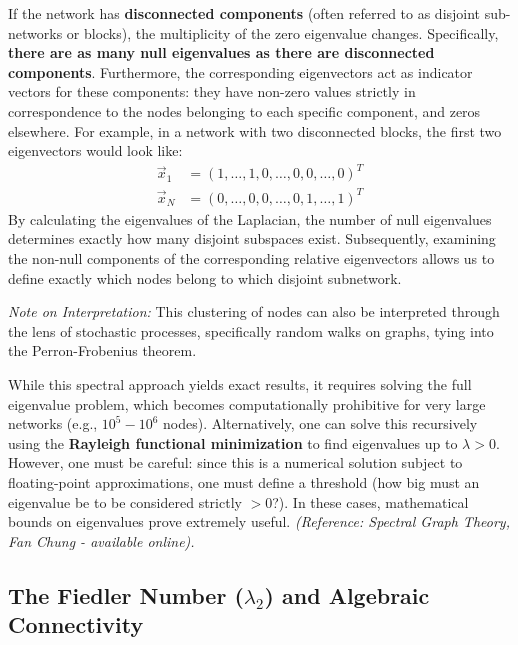 If the network has \textbf{disconnected components} (often referred to as disjoint sub-networks or blocks), the multiplicity of the zero eigenvalue changes. Specifically, \textbf{there are as many null eigenvalues as there are disconnected components}.
Furthermore, the corresponding eigenvectors act as indicator vectors for these components: they have non-zero values strictly in correspondence to the nodes belonging to each specific component, and zeros elsewhere. For example, in a network with two disconnected blocks, the first two eigenvectors would look like:
\[
    \begin{aligned}
        \vec{x}_1 & = (1, \dots, 1, 0, \dots, 0, 0, \dots, 0)^T \\
        \vec{x}_N & = (0, \dots, 0, 0, \dots, 0, 1, \dots, 1)^T
    \end{aligned}
\]
By calculating the eigenvalues of the Laplacian, the number of null eigenvalues determines exactly how many disjoint subspaces exist. Subsequently, examining the non-null components of the corresponding relative eigenvectors allows us to define exactly which nodes belong to which disjoint subnetwork.

\textit{Note on Interpretation:} This clustering of nodes can also be interpreted through the lens of stochastic processes, specifically random walks on graphs, tying into the Perron-Frobenius theorem.

\begin{remark}
    While this spectral approach yields exact results, it requires solving the full eigenvalue problem, which becomes computationally prohibitive for very large networks (e.g., \( 10^5 - 10^6 \) nodes).
    Alternatively, one can solve this recursively using the \textbf{Rayleigh functional minimization} to find eigenvalues up to \( \lambda > 0 \). However, one must be careful: since this is a numerical solution subject to floating-point approximations, one must define a threshold (how big must an eigenvalue be to be considered strictly \( > 0 \)?). In these cases, mathematical bounds on eigenvalues prove extremely useful.
    \textit{(Reference: Spectral Graph Theory, Fan Chung - available online).}
\end{remark}

\subsection{The Fiedler Number (\( \lambda_2 \)) and Algebraic Connectivity}


